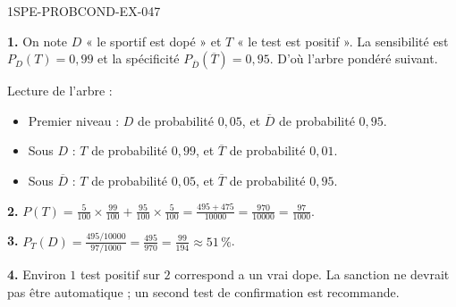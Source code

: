 \begin{corrige}{1SPE-PROBCOND-EX-047}

\textbf{1.} On note $D$ « le sportif est dopé » et $T$ « le test est positif ». La sensibilité est $P_D(T) = 0{,}99$ et la spécificité $P_{\overline{D}}(\overline{T}) = 0{,}95$. D'où l'arbre pondéré suivant.

\begin{nxarbreproba}
\end{nxarbreproba}

Lecture de l'arbre :

\begin{itemize}
  \item Premier niveau : $D$ de probabilité $0{,}05$, et $\overline{D}$ de probabilité $0{,}95$.
  \item Sous $D$ : $T$ de probabilité $0{,}99$, et $\overline{T}$ de probabilité $0{,}01$.
  \item Sous $\overline{D}$ : $T$ de probabilité $0{,}05$, et $\overline{T}$ de probabilité $0{,}95$.
\end{itemize}

\medskip

\textbf{2.} $P(T) = \frac{5}{100}\times\frac{99}{100}+\frac{95}{100}\times\frac{5}{100} = \frac{495+475}{10000} = \frac{970}{10000} = \frac{97}{1000}$.

\textbf{3.} $P_T(D) = \frac{495/10000}{97/1000} = \frac{495}{970} = \frac{99}{194} \approx 51\,\%$.

\textbf{4.} Environ $1$ test positif sur $2$ correspond a un vrai dope. La sanction ne devrait pas être automatique ; un second test de confirmation est recommande.

\end{corrige}
